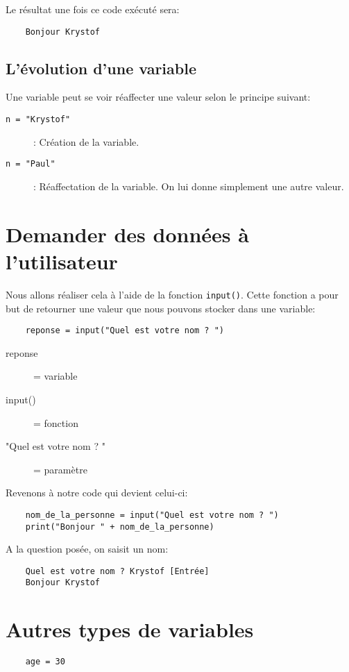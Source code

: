 Le résultat une fois ce code exécuté sera:
\begin{verbatim}
    Bonjour Krystof
\end{verbatim}
\medskip

\subsection*{L'évolution d'une variable}
Une variable peut se voir réaffecter une valeur selon le principe suivant:
\begin{description}
	\item[\texttt{n = "Krystof"}]: Création de la variable.
	\item[\texttt{n = "Paul"}]: Réaffectation de la variable. On lui donne simplement une autre valeur.
\end{description}
\medskip

\section{Demander des données à l'utilisateur}
Nous allons réaliser cela à l'aide de la fonction \texttt{input()}. Cette fonction a pour but de retourner une valeur que nous pouvons stocker dans une variable:
\begin{verbatim}
    reponse = input("Quel est votre nom ? ")
\end{verbatim}
\begin{description}
    \item[reponse] = variable
    \item[input()] = fonction
    \item["Quel est votre nom ? "] = paramètre
\end{description}
\medskip

Revenons à notre code qui devient celui-ci:
\begin{lstlisting}
    nom_de_la_personne = input("Quel est votre nom ? ")
    print("Bonjour " + nom_de_la_personne)
\end{lstlisting}
\medskip

A la question posée, on saisit un nom:
\begin{verbatim}
    Quel est votre nom ? Krystof [Entrée]
    Bonjour Krystof
\end{verbatim}
\medskip

\section{Autres types de variables}
\begin{verbatim}
    age = 30
\end{verbatim}
\medskip

